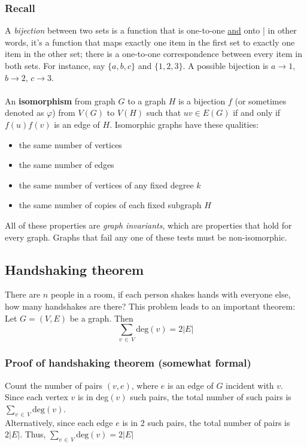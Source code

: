 \documentclass{report}
\begin{document}
\subsubsection{Recall}
A \textit{bijection} between two sets is a function that is one-to-one \underline{and} onto | in other words, it's a function that maps exactly one item in the first set to exactly one item in the other set; there is a one-to-one correspondence between every item in both sets. For instance, say $\{a, b, c\}$ and $\{1, 2, 3\}$. A possible bijection is $a \rightarrow 1$, $b \rightarrow 2$, $c \rightarrow 3$. \\\\
An \textbf{isomorphism} from graph $G$ to a graph $H$ is a bijection $f$ (or sometimes denoted as $\varphi$) from $V(G)$ to $V(H)$ such that $uv \in E(G)$ if and only if $f(u)f(v)$ is an edge of $H$. Isomorphic graphs have these qualities:
\begin{itemize}
\item the same number of vertices
\item the same number of edges
\item the same number of vertices of any fixed degree $k$
\item the same number of copies of each fixed subgraph $H$
\end{itemize}
All of these properties are \textit{graph invariants}, which are properties that hold for every graph. Graphs that fail any one of these tests must be non-isomorphic.
\subsection{Handshaking theorem}
There are $n$ people in a room, if each person shakes hands with everyone else, how many handshakes are there? This problem leads to an important theorem:\\
Let $G = (V, E)$ be a graph. Then
\begin{equation}
\sum_{v \,\in\, V} \mathrm{deg}(v) = 2 \vert E \vert
\end{equation}
\subsubsection{Proof of handshaking theorem (somewhat formal)}
Count the number of pairs $(v, e)$, where $e$ is an edge of $G$ incident with $v$.\\
Since each vertex $v$ is in deg$(v)$ such pairs, the total number of such pairs is $\displaystyle \sum_{v \,\in\, V} \mathrm{deg}(v)$.\\
Alternatively, since each edge $e$ is in 2 such pairs, the total number of pairs is $2 \vert E \vert$. Thus, $\displaystyle \sum_{v \,\in\, V} \mathrm{deg}(v) = 2 \vert E \vert$
\end{document}
